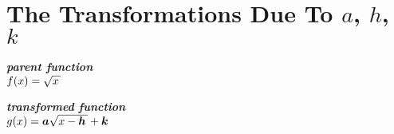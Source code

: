 \section{The Transformations Due To $a$, $h$, $k$}

\begin{tcbraster}[
    raster equal height,
    raster left skip = 1in, raster right skip = 1in, 
    raster column skip = 0.5in,
    raster before skip = 1\baselineskip, raster after skip = 1\baselineskip,
    ]
    \begin{tcolorbox}[]
        \centering
        {\bfseries\itshape parent function}\\[0.5\baselineskip]
        \large
        $f(x) = \myRoot{x}$
    \end{tcolorbox}
    \begin{tcolorbox}[]
        \centering
        {\bfseries\itshape transformed function}\\[0.5\baselineskip]
        \large
        $g(x) = \bm{a} \myRoot{x-\bm{h}} + \bm{k}$
    \end{tcolorbox}
\end{tcbraster}

\begin{tcbraster}[]
\end{tcbraster}


